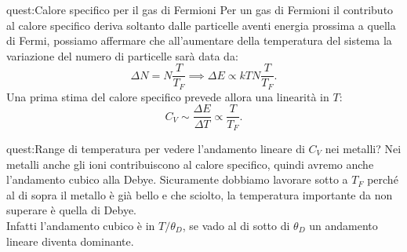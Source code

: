 \begin{quest}{quest:Calore specifico per il gas di Fermioni}
Per un gas di Fermioni il contributo al calore specifico deriva soltanto dalle particelle aventi energia prossima a quella di Fermi, possiamo affermare che all'aumentare della temperatura del sistema la variazione del numero di particelle sarà data da: 
\[
    \Delta  N = N \frac{T}{T_F} \implies
    \Delta E \propto   kT N \frac{T}{T_F}
.\] 
Una prima stima del calore specifico prevede allora una linearità in $T$: 
\[
    C_V \sim \frac{\Delta E}{\Delta T} \propto  \frac{T}{T_F}
.\]
\end{quest}
\begin{quest}{quest:Range di temperatura per vedere l'andamento lineare di $C_V$ nei metalli?}
Nei metalli anche gli ioni contribuiscono al calore specifico, quindi avremo anche l'andamento cubico alla Debye. Sicuramente dobbiamo lavorare sotto a $T_F$ perché al di sopra il metallo è già bello e che sciolto, la temperatura importante da non superare è quella di Debye.\\
Infatti l'andamento cubico è in $T /\theta_D$, se vado al di sotto di $\theta_D$ un andamento lineare diventa dominante.
\end{quest}

